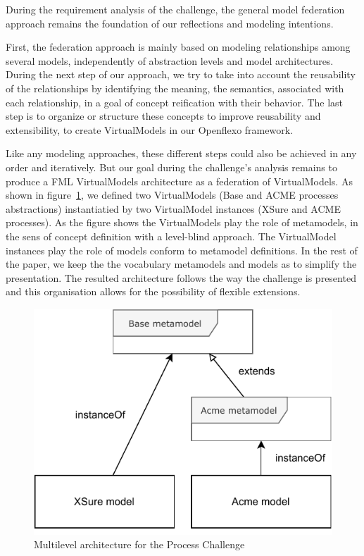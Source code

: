 
During the requirement analysis of the challenge, the general model federation approach remains the foundation of our reflections and modeling intentions. 

First, the federation approach is mainly based on modeling relationships among several models, independently of abstraction levels and model architectures.
During the next step of our approach, we try to take into account the reusability of the relationships by identifying the meaning, the semantics, associated with each relationship, in a goal of concept reification with their behavior. The last step is to organize or structure these concepts to improve reusability and extensibility, to create VirtualModels in our Openflexo framework.     

Like any modeling approaches, these different steps could also be achieved in any order and iteratively. But our goal during the challenge's analysis remains to produce a FML VirtualModels architecture as a federation of VirtualModels. 
As shown in figure~\ref{fig:MultilevelArchitecture}, we defined two VirtualModels (Base and ACME processes abstractions) instantiatied by two VirtualModel instances (XSure and ACME processes). As the figure shows the VirtualModels play the role of metamodels, in the sens of concept definition with a level-blind approach. The VirtualModel instances play the role of models conform to metamodel definitions. In the rest of the paper, we keep the the vocabulary metamodels and models as to simplify the presentation.
The resulted architecture follows the way the challenge is presented and this organisation allows for the possibility of flexible extensions.

\begin{figure}
    \centering
    \includegraphics[width=0.7 \columnwidth]{Figures/MultilevelArchitecture.pdf}
    \caption{Multilevel architecture for the Process Challenge}
    \label{fig:MultilevelArchitecture}
\end{figure}

